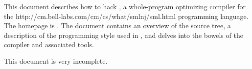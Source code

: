 This document describes how to hack {\mlton}, a
whole-program optimizing compiler for the
		  {http://cm.bell-labs.com/cm/cs/what/smlnj/sml.html}
programming language.
The {\mlton} homepage is \absolutelink{}.
The document contains an overview of the source tree, a description of the
programming style used in {\mlton}, and delves into the bowels of the compiler
and associated tools.

This document is very incomplete.  
